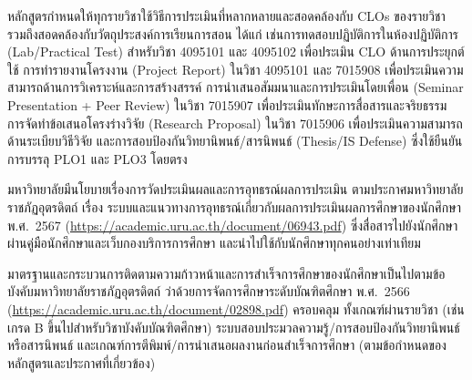 


หลักสูตรกำหนดให้ทุกรายวิชาใช้วิธีการประเมินที่หลากหลายและสอดคล้องกับ CLOs ของรายวิชา รวมถึงสอดคล้องกับวัตถุประสงค์การเรียนการสอน ได้แก่
เช่นการทดสอบปฏิบัติการในห้องปฏิบัติการ (Lab/Practical Test) สำหรับวิชา 4095101 และ 4095102 เพื่อประเมิน CLO ด้านการประยุกต์ใช้ การทำรายงานโครงงาน (Project Report) ในวิชา 4095101 และ 7015908 เพื่อประเมินความสามารถด้านการวิเคราะห์และการสร้างสรรค์ การนำเสนอสัมมนาและการประเมินโดยเพื่อน (Seminar Presentation + Peer Review) ในวิชา 7015907 เพื่อประเมินทักษะการสื่อสารและจริยธรรม การจัดทำข้อเสนอโครงร่างวิจัย (Research Proposal) ในวิชา 7015906 เพื่อประเมินความสามารถด้านระเบียบวิธีวิจัย และการสอบป้องกันวิทยานิพนธ์/สารนิพนธ์ (Thesis/IS Defense) ซึ่งใช้ยืนยันการบรรลุ PLO1 และ PLO3 โดยตรง


มหาวิทยาลัยมีนโยบายเรื่องการวัดประเมินผลและการอุทธรณ์ผลการประเมิน ตามประกาศมหาวิทยาลัยราชภัฏอุตรดิตถ์ เรื่อง ระบบและแนวทางการอุทธรณ์เกี่ยวกับผลการประเมินผลการศึกษาของนักศึกษา พ.ศ.~2567 (\url{https://academic.uru.ac.th/document/06943.pdf}) ซึ่งสื่อสารไปยังนักศึกษาผ่านคู่มือนักศึกษาและเว็บกองบริการการศึกษา และนำไปใช้กับนักศึกษาทุกคนอย่างเท่าเทียม


มาตรฐานและกระบวนการติดตามความก้าวหน้าและการสำเร็จการศึกษาของนักศึกษาเป็นไปตามข้อบังคับมหาวิทยาลัยราชภัฏอุตรดิตถ์ ว่าด้วยการจัดการศึกษาระดับบัณฑิตศึกษา พ.ศ.~2566 (\url{https://academic.uru.ac.th/document/02898.pdf}) ครอบคลุม
ทั้งเกณฑ์ผ่านรายวิชา (เช่น เกรด B ขึ้นไปสำหรับวิชาบังคับบัณฑิตศึกษา) ระบบสอบประมวลความรู้/การสอบป้องกันวิทยานิพนธ์หรือสารนิพนธ์ และเกณฑ์การตีพิมพ์/การนำเสนอผลงานก่อนสำเร็จการศึกษา (ตามข้อกำหนดของหลักสูตรและประกาศที่เกี่ยวข้อง)

